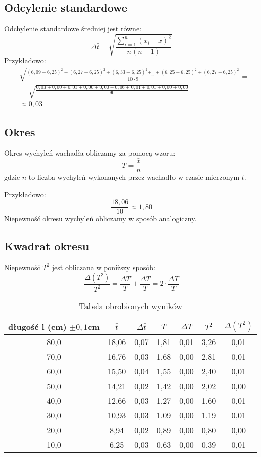 \documentclass[a4paper,12pt]{article}
\begin{document}
\subsection*{Odcylenie standardowe}
Odchylenie standardowe średniej jest równe:
\[ \Delta \bar{t} = \sqrt{\frac{\sum \limits^n_{i = 1}\left( x_i - \bar{x}\right)^2}{n\left(n-1 \right)}}\]
Przykładowo:
\begin{align*}
		&\sqrt{\frac{\left( 6,09- 6,25 \right)^2 +
		\left( 6,27- 6,25 \right)^2 +
		\left( 6,33- 6,25 \right)^2 +_{\dots} +
		\left( 6,25- 6,25 \right)^2 +
		\left( 6,27 - 6,25 \right)^2}{10 \cdot 9}} =\\
		&= \sqrt{\frac{0,03 + 0,00 + 0,01 + 0,00 + 0,00 + 0,06 + 0,01 + 0,01 + 0,00 + 0,00}{90}} = \\
		&\approx 0,03
\end{align*}

\subsection*{Okres}

Okres wychyleń wachadła obliczamy za pomocą wzoru:
\[ T = \frac{\bar{x}}{n}\]
gdzie $n$ to liczba wychyleń wykonanych przez wachadło w czasie mierzonym $t$.

Przykładowo:
\[ \frac{18,06}{10} \approx 1,80 \]
Niepewność okresu wychyleń obliczamy w sposób analogiczny.

\subsection*{Kwadrat okresu}

Niepewność $T^2$ jest obliczana w poniższy sposób:
\[\frac{\Delta \left(T^2\right)}{T^2} = \frac{\Delta T}{T} + \frac{\Delta T}{T} = 2 \cdot \frac{\Delta T}{T}\]

\begin{table}[h]
		\centering
		\begin{tabular}{|c|c|c|c|c|c|c|}
				\hline
				długość l (cm) $\pm 0,1$cm & $\bar{t}$ & $\Delta \bar{t}$ & $T$ & $\Delta T$ & $T^2$ & $\Delta \left( T^2 \right)$ \\ \hline 
  80,0  & 18,06 & 0,07 & 1,81 & 0,01 & 3,26 & 0,01\\
  70,0  & 16,76 & 0,03 & 1,68 & 0,00 & 2,81 & 0,01\\
  60,0  & 15,50 & 0,04 & 1,55 & 0,00 & 2,40 & 0,01\\
  50,0  & 14,21 & 0,02 & 1,42 & 0,00 & 2,02 & 0,00\\
  40,0  & 12,66 & 0,03 & 1,27 & 0,00 & 1,60 & 0,01\\
  30,0  & 10,93 & 0,03 & 1,09 & 0,00 & 1,19 & 0,01\\
  20,0  & 8,94 & 0,02 & 0,89 & 0,00 & 0,80 & 0,00\\
  10,0  & 6,25 & 0,03 & 0,63 & 0,00 & 0,39 & 0,01\\\hline 

		\end{tabular}
		\caption{Tabela obrobionych wyników}
		\label{tab:obrobione}
\end{table}
\end{document}
